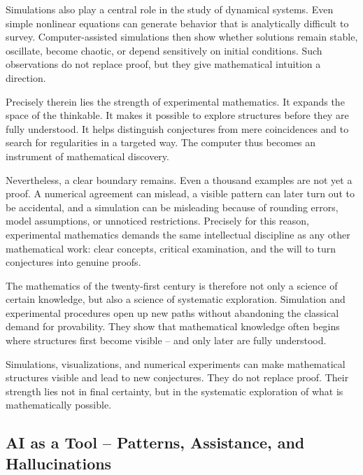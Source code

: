 Simulations also play a central role
in the study of dynamical systems.
Even simple nonlinear equations can generate behavior
that is analytically difficult to survey.
Computer-assisted simulations then show
whether solutions remain stable,
oscillate,
become chaotic,
or depend sensitively on initial conditions.
Such observations do not replace proof,
but they give mathematical intuition a direction.

Precisely therein lies the strength of experimental mathematics.
It expands the space of the thinkable.
It makes it possible to explore structures
before they are fully understood.
It helps distinguish conjectures from mere coincidences
and to search for regularities in a targeted way.
The computer thus becomes an instrument of mathematical discovery.

Nevertheless, a clear boundary remains.
Even a thousand examples are not yet a proof.
A numerical agreement can mislead,
a visible pattern can later turn out to be accidental,
and a simulation can be misleading
because of rounding errors,
model assumptions,
or unnoticed restrictions.
Precisely for this reason,
experimental mathematics demands the same intellectual discipline
as any other mathematical work:
clear concepts,
critical examination,
and the will to turn conjectures into genuine proofs.

The mathematics of the twenty-first century is therefore not only a science of certain knowledge,
but also a science of systematic exploration.
Simulation and experimental procedures open up new paths
without abandoning the classical demand for provability.
They show
that mathematical knowledge often begins where structures first become visible --
and only later are fully understood.

\begin{DidacticBox}
	\label{box:experimental-mathematics}
	Simulations, visualizations, and numerical experiments
	can make mathematical structures visible
	and lead to new conjectures.
	They do not replace proof.
	Their strength lies not in final certainty,
	but in the systematic exploration of what is mathematically possible.
\end{DidacticBox}


\subsection{AI as a Tool -- Patterns, Assistance, and Hallucinations}

